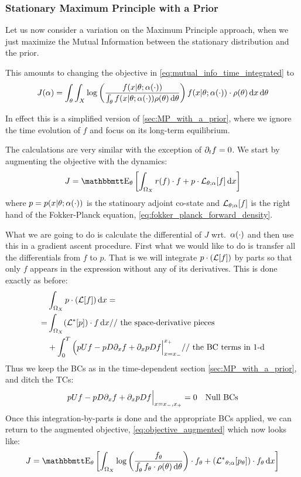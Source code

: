 \documentclass{article}
\begin{document}
\subsubsection{Stationary Maximum Principle with a Prior}
\label{sec:StatMP_with_a_prior}
Let us now consider a variation on the Maximum Principle approach, when we just
maximize the Mutual Information between the stationary distribution and the
prior.

This amounts to changing the objective in
\cref{eq:mutual_info_time_integrated} to  
$$
J({\alpha})  = \int_{\theta} \int_X
 \log\left(\frac{f(x|{\theta} ; {\alpha}(\cdot) )}
 			{\int_{\theta} f(x|{\theta}; {\alpha}(\cdot)) \rho({\theta})\, \mathrm{d} {\theta}}\right) 
 f(x|{\theta}; {\alpha}(\cdot)) \cdot \rho({\theta}) \, \mathrm{d} x\, \mathrm{d} {\theta}
$$

In effect this is a simplified version of \cref{sec:MP_with_a_prior}, where we
ignore the time evolution of $f$ and focus on its long-term equilibrium.

The calculations are very similar with the exception of ${\partial}_t f = 0$. We start
by augmenting the objective with the dynamics:
\begin{equation}
J =  \Exp_\th
\left[ \int_{\O_X} r(f) \cdot f + p \cdot \L_{\th;\a}[f]
\intd{x}\right] 
\label{eq:objective_stat_augmented}
\end{equation} 
where $p =  p(x|{\theta}; {\alpha}(\cdot))$ is the statinoary adjoint co-state and 
${ \mathcal{L} }_{{\theta};{\alpha}}[f]$ is the right hand of the Fokker-Planck equation,
\cref{eq:fokker_planck_forward_density}.

What we are going to do is calculate the differential of $J$ wrt.\ ${\alpha}(\cdot)$
and then use this in a gradient ascent procedure. First what we would like to do
is transfer all the differentials from $f$ to $p$. That is we will integrate $p
\cdot ({ \mathcal{L} }[f])$ by parts so that only $f$ appears in the expression
without any of its derivatives. This is done exactly as before:
\begin{align*}
& \int_{{\Omega}_X} p \cdot ({ \mathcal{L} }[f]) \, \mathrm{d} x=
\\
=& \int_{{\Omega}_X}
	    ({ { \mathcal{L} }^* }[p])\cdot f 
	 \, \mathrm{d} x  \textrm{// the space-derivative pieces }
	  \\
	  &+ \int_0^T 
	   \Big( p U f - p D {\partial}_xf + {\partial}_x p D f \Big|_{x={ x_{-} }}^{{ x_{+} }} 
	   \textrm{// the BC terms in 1-d}
\end{align*}
Thus we keep the BCs as in the time-dependent section
\cref{sec:MP_with_a_prior}, and ditch the TCs:
\begin{align*}
p U f - p D {\partial}_xf + {\partial}_x p D f &\Big|_{x={ x_{-} }, { x_{+} }} = 0 & \textrm{Null BCs}
\end{align*}
Once this integration-by-parts is done and the appropriate BCs applied, we
can return to the augmented objective, \cref{eq:objective_augmented} which now
looks like:
\begin{equation}
J =  \Exp_\th
\left[ \int_{\O_X} \log\left(\frac{f_\th}
 					{\int_\th f_\th \cdot \rho(\th)\intd{\th}}\right) 
 			 \cdot f_\th 
 			 + 
 			 (\Lstar_{\th;\a}[p_\th] ) \cdot f_\th
\intd{x}
\right]
\label{eq:objective_stat_augmented_adjoined}
\end{equation}
\end{document}

